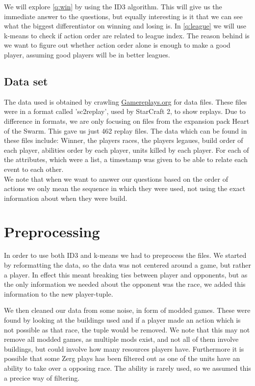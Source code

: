 \documentclass[a4paper,11pt]{article}
\begin{document}
We will explore \ref{q:win} by using the ID3 algorithm. This will give us the immediate answer to the questions, but equally interesting is it that we can see what the biggest differentiator on winning and losing is. In \ref{q:league} we will use k-means  to check if action order are related to league index. The reason behind is we want to figure out whether action order alone is enough to make a good player, assuming good players will be in better leagues.

\subsection{Data set}
The data used is obtained by crawling \url{Gamereplays.org} for data files.
These files were in a format called 'sc2replay', used by StarCraft 2, to show replays. Due to difference in formats, we are only focusing on files from the expansion pack Heart of the Swarm. This gave us just 462 replay files. The data which can be found in these files include: Winner, the players races, the players legaues, build order of each player, abilities order by each player, units killed by each player.
For each of the attributes, which were a list, a timestamp was given to be able to relate each event to each other.\\

We note that when we want to answer our questions based on the order of actions we only mean the sequence in which they were used, not using the exact information about when they were build.

\section{Preprocessing}
In order to use both ID3 and k-means we had to preprocess the files. We started by reformatting the data, so the data was not centered around a game, but rather a player.
In effect this meant breaking ties between player and opponents, but as the only information we needed about the opponent was the race, we added this information to the new player-tuple.

We then cleaned our data from some noise, in form of modded games. These were found by looking at the buildings used and if a player made an action which is not possible as that race, the tuple would be removed. We note that this may not remove all modded games, as multiple mods exist, and not all of them involve buildings, but could involve how many resources players have. Furthermore it is possible that some Zerg plays has been filtered out as one of the units have an ability to take over a opposing race. The ability is rarely used, so we assumed this a precice way of filtering.
\end{document}
